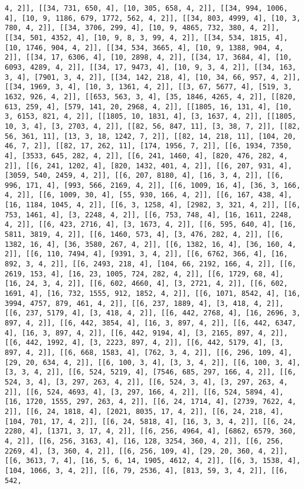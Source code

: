 \documentclass[12pt,fleqn]{article}\usepackage{../../common}
\begin{document}
\begin{verbatim}
4, 2]], [[34, 731, 650, 4], [10, 305, 658, 4, 2]], [[34, 994, 1006, 4], [10, 9, 1186, 679, 1772, 562, 4, 2]], [[34, 803, 4999, 4], [10, 3, 780, 4, 2]], [[34, 3706, 299, 4], [10, 9, 4865, 732, 380, 4, 2]], [[34, 501, 4352, 4], [10, 9, 8, 3, 99, 4, 2]], [[34, 534, 1815, 4], [10, 1746, 904, 4, 2]], [[34, 534, 3665, 4], [10, 9, 1388, 904, 4, 2]], [[34, 17, 6306, 4], [10, 2898, 4, 2]], [[34, 17, 3684, 4], [10, 6093, 4289, 4, 2]], [[34, 17, 9473, 4], [10, 9, 3, 4, 2]], [[34, 163, 3, 4], [7901, 3, 4, 2]], [[34, 142, 218, 4], [10, 34, 66, 957, 4, 2]], [[34, 1969, 3, 4], [10, 3, 1361, 4, 2]], [[3, 67, 5677, 4], [519, 3, 1632, 926, 4, 2]], [[653, 563, 3, 4], [35, 1846, 4265, 4, 2]], [[820, 613, 259, 4], [579, 141, 20, 2968, 4, 2]], [[1805, 16, 131, 4], [10, 3, 6153, 821, 4, 2]], [[1805, 10, 1831, 4], [3, 1637, 4, 2]], [[1805, 10, 3, 4], [3, 2703, 4, 2]], [[82, 56, 847, 11], [3, 38, 7, 2]], [[82, 56, 361, 11], [13, 3, 18, 1242, 7, 2]], [[82, 14, 218, 11], [104, 20, 46, 7, 2]], [[82, 17, 262, 11], [174, 1956, 7, 2]], [[6, 1934, 7350, 4], [3533, 645, 282, 4, 2]], [[6, 241, 1460, 4], [820, 476, 282, 4, 2]], [[6, 241, 1202, 4], [820, 1432, 401, 4, 2]], [[6, 207, 931, 4], [3059, 540, 2459, 4, 2]], [[6, 207, 8180, 4], [16, 3, 4, 2]], [[6, 996, 171, 4], [993, 566, 2169, 4, 2]], [[6, 1009, 16, 4], [36, 3, 166, 4, 2]], [[6, 1009, 30, 4], [55, 930, 166, 4, 2]], [[6, 167, 438, 4], [16, 1184, 1045, 4, 2]], [[6, 3, 1258, 4], [2982, 3, 321, 4, 2]], [[6, 753, 1461, 4], [3, 2248, 4, 2]], [[6, 753, 748, 4], [16, 1611, 2248, 4, 2]], [[6, 423, 2716, 4], [3, 1673, 4, 2]], [[6, 595, 640, 4], [16, 5811, 3819, 4, 2]], [[6, 1460, 573, 4], [3, 476, 282, 4, 2]], [[6, 1382, 16, 4], [36, 3580, 267, 4, 2]], [[6, 1382, 16, 4], [36, 160, 4, 2]], [[6, 110, 7494, 4], [9391, 3, 4, 2]], [[6, 6762, 366, 4], [16, 892, 3, 4, 2]], [[6, 2493, 218, 4], [104, 66, 2192, 166, 4, 2]], [[6, 2619, 153, 4], [16, 23, 1005, 724, 282, 4, 2]], [[6, 1729, 68, 4], [16, 24, 3, 4, 2]], [[6, 602, 4660, 4], [3, 2721, 4, 2]], [[6, 602, 1691, 4], [16, 732, 1555, 912, 1852, 4, 2]], [[6, 1071, 8542, 4], [16, 3994, 4757, 879, 461, 4, 2]], [[6, 237, 1889, 4], [3, 418, 4, 2]], [[6, 237, 5179, 4], [3, 418, 4, 2]], [[6, 442, 2768, 4], [16, 2696, 3, 897, 4, 2]], [[6, 442, 3854, 4], [16, 3, 897, 4, 2]], [[6, 442, 6347, 4], [16, 3, 897, 4, 2]], [[6, 442, 9194, 4], [3, 2165, 897, 4, 2]], [[6, 442, 1992, 4], [3, 2223, 897, 4, 2]], [[6, 442, 5179, 4], [3, 897, 4, 2]], [[6, 668, 1583, 4], [762, 3, 4, 2]], [[6, 296, 109, 4], [29, 20, 634, 4, 2]], [[6, 100, 3, 4], [3, 3, 4, 2]], [[6, 100, 3, 4], [3, 3, 4, 2]], [[6, 524, 5219, 4], [7546, 685, 297, 166, 4, 2]], [[6, 524, 3, 4], [3, 297, 263, 4, 2]], [[6, 524, 3, 4], [3, 297, 263, 4, 2]], [[6, 524, 4693, 4], [3, 297, 166, 4, 2]], [[6, 524, 5894, 4], [16, 1720, 1555, 297, 263, 4, 2]], [[6, 24, 1714, 4], [2739, 7622, 4, 2]], [[6, 24, 1818, 4], [2021, 8035, 17, 4, 2]], [[6, 24, 218, 4], [104, 701, 17, 4, 2]], [[6, 24, 5818, 4], [16, 3, 3, 4, 2]], [[6, 24, 2280, 4], [1371, 3, 17, 4, 2]], [[6, 256, 4964, 4], [6862, 6579, 360, 4, 2]], [[6, 256, 3163, 4], [16, 128, 3254, 360, 4, 2]], [[6, 256, 2269, 4], [3, 360, 4, 2]], [[6, 256, 109, 4], [29, 20, 360, 4, 2]], [[6, 3613, 7, 4], [16, 5, 6, 14, 1905, 4612, 4, 2]], [[6, 3, 1538, 4], [104, 1066, 3, 4, 2]], [[6, 79, 2536, 4], [813, 59, 3, 4, 2]], [[6, 542, 
\end{verbatim}
\end{document}
